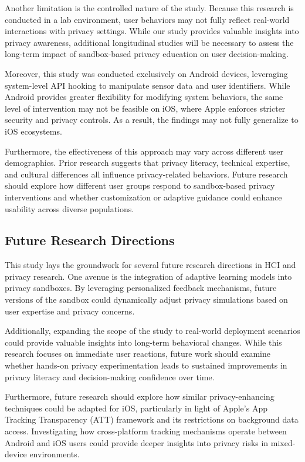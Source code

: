 \documentclass[acmlarge, nonacm]{acmart}
\begin{document}
Another limitation is the controlled nature of the study. Because this research is conducted in a lab environment, user behaviors may not fully reflect real-world interactions with privacy settings. While our study provides valuable insights into privacy awareness, additional longitudinal studies will be necessary to assess the long-term impact of sandbox-based privacy education on user decision-making. 

Moreover, this study was conducted exclusively on Android devices, leveraging system-level API hooking to manipulate sensor data and user identifiers. While Android provides greater flexibility for modifying system behaviors, the same level of intervention may not be feasible on iOS, where Apple enforces stricter security and privacy controls. As a result, the findings may not fully generalize to iOS ecosystems.

Furthermore, the effectiveness of this approach may vary across different user demographics. Prior research suggests that privacy literacy, technical expertise, and cultural differences all influence privacy-related behaviors. Future research should explore how different user groups respond to sandbox-based privacy interventions and whether customization or adaptive guidance could enhance usability across diverse populations.



\subsection{Future Research Directions}

This study lays the groundwork for several future research directions in HCI and privacy research. One avenue is the integration of adaptive learning models into privacy sandboxes. By leveraging personalized feedback mechanisms, future versions of the sandbox could dynamically adjust privacy simulations based on user expertise and privacy concerns.

Additionally, expanding the scope of the study to real-world deployment scenarios could provide valuable insights into long-term behavioral changes. While this research focuses on immediate user reactions, future work should examine whether hands-on privacy experimentation leads to sustained improvements in privacy literacy and decision-making confidence over time.

Furthermore, future research should explore how similar privacy-enhancing techniques could be adapted for iOS, particularly in light of Apple's App Tracking Transparency (ATT) framework \cite{apple_att} and its restrictions on background data access. Investigating how cross-platform tracking mechanisms operate between Android and iOS users could provide deeper insights into privacy risks in mixed-device environments.
\end{document}
